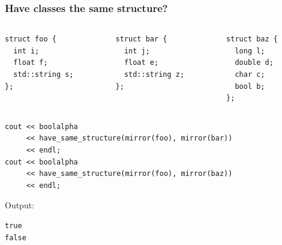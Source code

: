 \documentclass[aspectratio=169,compress,table,xcolor=table]{beamer}
\begin{document}
\begin{frame}[fragile]
  \frametitle{Have classes the same structure?}
  \begin{columns}
    \begin{column}{.33\textwidth}
      \begin{lstlisting}[language=c++2x,basicstyle=\scriptsize\ttfamily]
struct foo {
  int i;
  float f;
  std::string s;
};
      \end{lstlisting}
    \end{column}
    \begin{column}{.33\textwidth}
      \begin{lstlisting}[language=c++2x,basicstyle=\scriptsize\ttfamily]
struct bar {
  int j;
  float e;
  std::string z;
};
      \end{lstlisting}
    \end{column}
    \begin{column}{.33\textwidth}
      \begin{lstlisting}[language=c++2x,basicstyle=\scriptsize\ttfamily]
struct baz {
  long l;
  double d;
  char c;
  bool b;
};
      \end{lstlisting}
    \end{column}
  \end{columns}
  \begin{lstlisting}[language=c++2x,basicstyle=\scriptsize\ttfamily]
cout << boolalpha
     << have_same_structure(mirror(foo), mirror(bar))
     << endl;
cout << boolalpha
     << have_same_structure(mirror(foo), mirror(baz))
     << endl;
  \end{lstlisting}
  Output:
  \begin{verbatim}
true
false
  \end{verbatim}
\end{frame}
\end{document}
